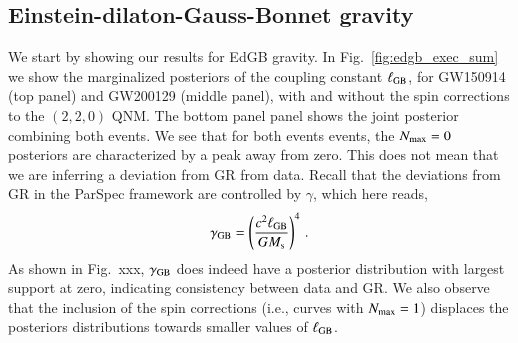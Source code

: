 \documentclass[twocolumn,
               prd,
               aps,
               superscriptaddress,
               tightenlines,
               nofootinbib,
               eqsecnum,
               amsfonts,
               amsmath,
               longbibliography]{revtex4-1}
\newcommand{\hs}[1]{{\textcolor{blue}{{[HS: #1]}} }}
\begin{document}



\subsection{Einstein-dilaton-Gauss-Bonnet gravity}
\label{sec:results_edgb}

We start by showing our results for EdGB gravity.
%
In Fig.~\ref{fig:edgb_exec_sum} we show the marginalized posteriors of the
coupling constant $\ell_{\rm GB}$, for GW150914 (top panel) and GW200129
(middle panel), with and without the spin corrections to the $(2,2,0)$ QNM.
%
The bottom panel panel shows the joint posterior combining both events.
%
We see that for both events events, the $N_{\rm max} = 0$ posteriors are
characterized by a peak away from zero.
%
This does not mean that we are inferring a deviation from GR from data.
%
Recall that the deviations from GR in the ParSpec framework are controlled
by $\gamma$, which here reads,
%
\begin{equation}
    \gamma_{\rm GB} = \left(\frac{c^2 \ell_{\rm GB}}{ G M_{\rm s}}\right)^4\,.
\end{equation}
%
As shown in Fig.~xxx, $\gamma_{\rm GB}$ does indeed have a posterior
distribution with largest support at zero, indicating consistency between data
and GR.
%
We also observe that the inclusion of the spin corrections (i.e., curves with $N_{\rm max} = 1$)
displaces the posteriors distributions towards smaller values of $\ell_{\rm GB}$.
\end{document}
